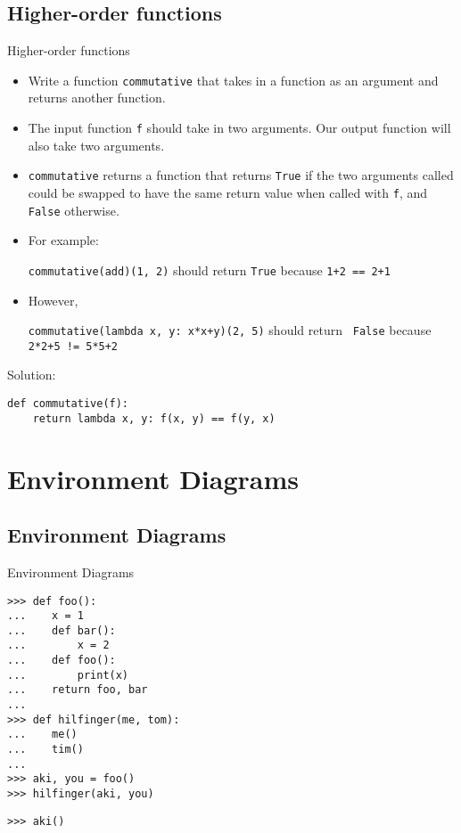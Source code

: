 \documentclass[9pt]{beamer}
\begin{document}
\subsection{Higher-order functions}
\begin{frame}[fragile]{Higher-order functions}
  \begin{itemize}
    \item
      Write a function {\tt commutative} that takes in a function as an
      argument and returns another function.

    \item
      The input function {\tt f} should take in two arguments. Our output function will also take two arguments.

    \item
      {\tt commutative} returns a function that returns {\tt True} if the
      two arguments called could be swapped to have the same return value
      when called with {\tt f}, and {\tt False} otherwise.

    \item
      For example:

      {\tt commutative(add)(1, 2)} should return {\tt True} because {\tt 1+2
      == 2+1}
    \item
      However,

      {\tt commutative(lambda x, y: x*x+y)(2, 5)} should return {\tt
      False} because {\tt 2*2+5 != 5*5+2}
  \end{itemize}

  \pause
  Solution:
  \begin{lstlisting}
def commutative(f):
    return lambda x, y: f(x, y) == f(y, x)
  \end{lstlisting}
\end{frame}

\section{Environment Diagrams}
\subsection{Environment Diagrams}
\begin{frame}[fragile]{Environment Diagrams}
  \begin{lstlisting}[numbers=none, frame=none, xleftmargin=0pt]
>>> def foo():
...    x = 1
...    def bar():
...        x = 2
...    def foo():
...        print(x)
...    return foo, bar
...
>>> def hilfinger(me, tom):
...    me()
...    tim()
...
>>> aki, you = foo()
>>> hilfinger(aki, you)
  \end{lstlisting}
  \begin{lstlisting}[numbers=none, frame=none, xleftmargin=0pt]
>>> aki()
  \end{lstlisting}
\end{frame}
\end{document}
